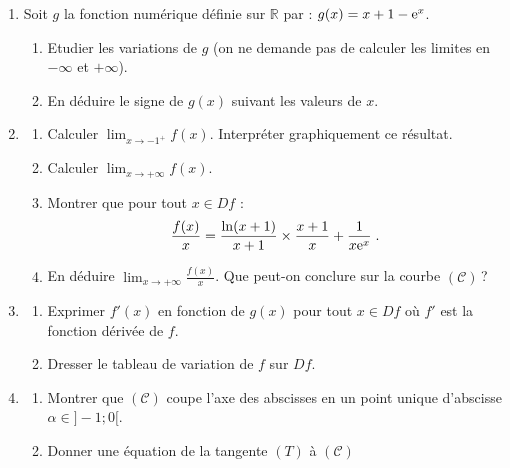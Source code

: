       \begin{enumerate}
            \item Soit $g$ la fonction num\'erique d\'efinie sur $\mathbb{R}$ par : $g(x) = x+1 - \mathrm{e}^{x}$.
                  \begin{enumerate}
                        \item Etudier les variations de $g$ 
                              (on ne demande pas de calculer les limites en $-\infty$ et $+\infty$).
                        \item En d\'eduire le signe de $g(x)$ suivant les valeurs de $x$.
                  \end{enumerate}
            \item \begin{enumerate}
                        \item Calculer $\displaystyle{\lim_{x\rightarrow -1^+} f(x)}$.
                              Interpr\'eter graphiquement ce r\'esultat.
                        \item Calculer $\displaystyle{\lim_{x\rightarrow +\infty} f(x)}$.
                        \item Montrer que pour tout $x\in Df$ :
                              \[
                                    \frac{f(x)}{x} = \frac{\ln (x+1)}{x+1} \times \frac{x+1}{x} + \frac{1}{x \mathrm{e}^{x}} \;.
                              \]
                        \item En d\'eduire $\displaystyle{\lim_{x\rightarrow +\infty} \frac{f(x)}{x}}$.
                              Que peut-on conclure sur la courbe $(\mathscr{C})$\,?
                  \end{enumerate} 
            \item \begin{enumerate}
                        \item Exprimer $f'(x)$ en fonction de $g(x)$
                              pour tout $x\in Df$ o\`u $f'$ est la fonction d\'eriv\'ee de $f$.
                        \item Dresser le tableau de variation de $f$ sur $Df$.
                  \end{enumerate}
            \item \begin{enumerate}
                        \item Montrer que $(\mathscr{C})$ coupe l'axe des abscisses en un point unique 
                              d'abscisse $\alpha \in ]-1 ; 0 [$.
                        \item Donner une \'equation de la tangente $(T)$ \`a $(\mathscr{C})$ 

\end{enumerate}
\end{enumerate}
